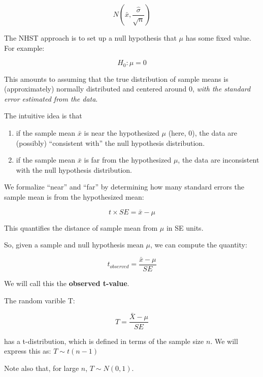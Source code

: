 \documentclass[12pt]{article}
\begin{document}
\begin{equation}
N(\bar{x},\frac{\hat \sigma}{\sqrt{n}})
\end{equation}

The NHST approach is to set up a null hypothesis that $\mu$ has some fixed value. For example:

\begin{equation}
H_0: \mu = 0
\end{equation}

This amounts to assuming that the true distribution of sample means is (approximately) normally distributed and centered around 0, \textit{with the standard error estimated from the data}.

The intuitive idea is that 

\begin{enumerate}
\item
if the sample mean $\bar{x}$ is near the hypothesized $\mu$ (here, 0), the data are (possibly) ``consistent with'' the null hypothesis distribution.
\item
if the sample mean $\bar{x}$ is far from the hypothesized $\mu$, the data are inconsistent with the null hypothesis distribution.
\end{enumerate}

We formalize ``near'' and ``far'' by determining how many standard errors the sample mean is from the hypothesized mean:

\begin{equation}
t \times SE = \bar{x} - \mu 
\end{equation}

This quantifies the distance of sample mean from $\mu$ in SE units.


So, given a sample and null hypothesis mean $\mu$, we can compute the quantity: 

\begin{equation}
t_{observed}  = \frac{\bar{x} - \mu}{SE}
\end{equation}

We will call this the \textbf{observed t-value}.

The random varible T:

\begin{equation}
T  = \frac{\bar{X} - \mu}{SE}
\end{equation}

has a t-distribution, which is defined in terms of the sample size $n$. 
We will express this as: $T \sim t(n-1)$ 

Note also that, for large $n$, $T\sim N(0,1)$. 
\end{document}
